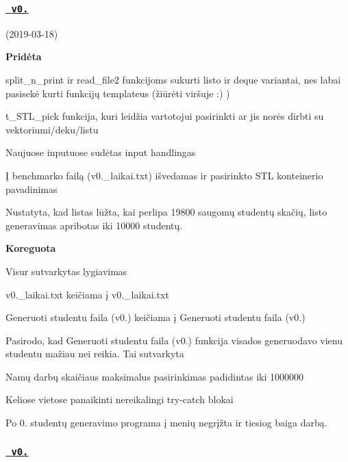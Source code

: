  \subsubsection*{\href{https://github.com/gitguuddd/Obj_Duomenu_apdorojimas/releases/tag/v0.5}{\texttt{ v0.}}}

(2019-\/03-\/18)  

{\bfseries{Pridėta}}
\begin{DoxyItemize}
\item {\ttfamily split\+\_\+n\+\_\+print} ir {\ttfamily read\+\_\+file2} funkcijoms sukurti listo ir deque variantai, nes labai pasisekė kurti funkcijų template\textquotesingle{}us (žiūrėti viršuje \+:) )
\item {\ttfamily t\+\_\+\+S\+T\+L\+\_\+pick} funkcija, kuri leidžia vartotojui pasirinkti ar jis norės dirbti su vektoriumi/deku/listu
\item Naujuose inputuose sudėtas input handling\textquotesingle{}as
\item Į benchmark\textquotesingle{}o failą (v0.\+\_\+laikai.\+txt) išvedamas ir pasirinkto S\+TL konteinerio pavadinimas
\item Nustatyta, kad listas lūžta, kai perlipa 19800 saugomų studentų skačių, listo generavimas apribotas iki 10000 studentų.
\item 
\end{DoxyItemize}

{\bfseries{Koreguota}}
\begin{DoxyItemize}
\item Visur sutvarkytas lygiavimas
\item {\ttfamily v0.\+\_\+laikai.\+txt} keičiama į {\ttfamily v0.\+\_\+laikai.\+txt}
\item {\ttfamily Generuoti studentu faila (v0.)} keičiama į {\ttfamily Generuoti studentu faila (v0.)}
\item Pasirodo, kad {\ttfamily Generuoti studentu faila (v0.)} funkcija visados generuodavo vienu studentu mažiau nei reikia. Tai sutvarkyta
\item Namų darbų skaičiaus maksimalus pasirinkimas padidintas iki 1000000
\item Keliose vietose panaikinti nereikalingi try-\/catch blokai
\item Po 0. studentų generavimo programa į menių negrįžta ir tiesiog baiga darbą.
\end{DoxyItemize}



 \subsubsection*{\href{https://github.com/gitguuddd/Obj_Duomenu_apdorojimas/releases/tag/v0.4}{\texttt{ v0.}}}

